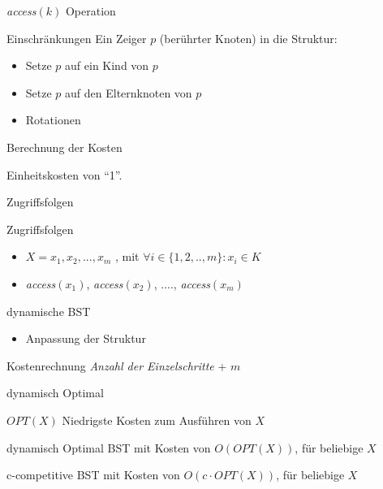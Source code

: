 \documentclass[11pt]{beamer}
\begin{document}
     \begin{frame} {	\textit{access}$\left(k\right)$ Operation}
     	\begin{block}{Einschränkungen}
     		Ein Zeiger $p$ (berührter Knoten) in die Struktur:
     		\begin{itemize}
     			\item Setze $p$ auf ein Kind von $p$ 
     			\item Setze $p$ auf den Elternknoten von $p$ 
     			\item Rotationen 
     		\end{itemize}	
     	\end{block}	
     	\pause 
     	\begin{block}{Berechnung der Kosten}
     		
     		Einheitskosten von \enquote{1}.
     	\end{block}	    	
     \end{frame}	    
     
      
  \begin{frame} {	Zugriffsfolgen} 
    \begin{block}{Zugriffsfolgen}
    	\begin{itemize}
    		\item   $X = x_1, x_2,..., x_m$ , mit $\forall i \in \{1,2,..,m\}: x_i \in K$
    		\item  \textit{access}$\left(x_1\right)$,   \textit{access}$\left(x_2\right)$, ....,  
    		\textit{access}$\left(x_m\right)$  
    	\end{itemize}
    \end{block}			
	\pause
   \begin{block}{dynamische BST}
	 \begin{itemize}
		\item Anpassung der Struktur 	 
 	\end{itemize}
   \end{block}			
 \begin{block}{Kostenrechnung}
		\textit{Anzahl der Einzelschritte} + $m$	 
\end{block}		
\end{frame}	  
  \begin{frame} {	dynamisch Optimal} 
	\begin{block}{$\mathit{OPT}\left(X\right)$}
		Niedrigste Kosten zum Ausführen von $X$ 
	\end{block}			
	\pause
	\begin{block}{dynamisch Optimal}
	BST mit Kosten von  $O\left(\mathit{OPT}\left(X\right)\right)$, für beliebige $X$
	\end{block}			
	\begin{block}{c-competitive}
		BST mit Kosten von  $O\left(c \cdot \mathit{OPT}\left(X\right)\right)$, für beliebige $X$	 
	\end{block}		
\end{frame}	  
    
\end{document}
